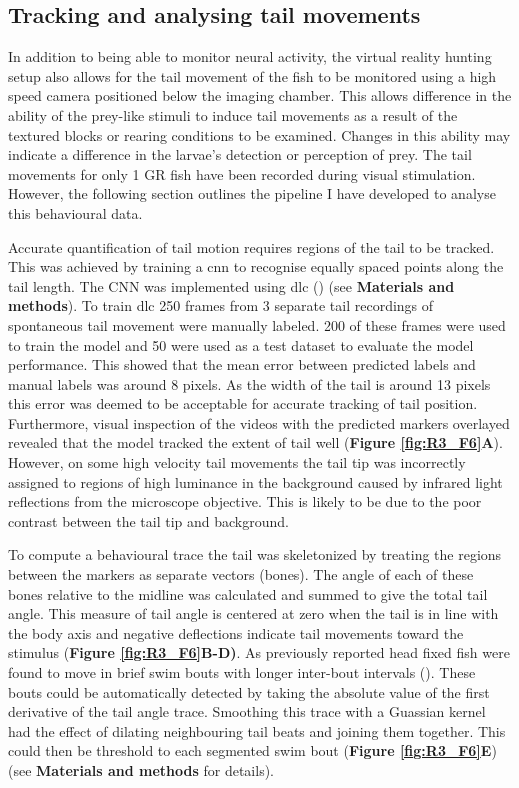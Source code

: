 \subsection{Tracking and analysing tail movements}
In addition to being able to monitor neural activity, the virtual reality hunting setup also allows for the tail movement of the fish to be monitored using a high speed camera positioned below the imaging chamber. This allows difference in the ability of the prey-like stimuli to induce tail movements as a result of the textured blocks or rearing conditions to be examined. Changes in this ability may indicate a difference in the larvae's detection or perception of prey. The tail movements for only 1 GR fish have been recorded during visual stimulation. However, the following section outlines the pipeline I have developed to analyse this behavioural data.

Accurate quantification of tail motion requires regions of the tail to be tracked. This was achieved by training a \gls{cnn} to recognise equally spaced points along the tail length.  The CNN was implemented using \gls{dlc} (\cite{Mathis2018DeepLabCut:Learning}) (see \textbf{Materials and methods}). To train \gls{dlc} 250 frames from 3 separate tail recordings of spontaneous tail movement were manually labeled. 200 of these frames were used to train the model and 50 were used as a test dataset to evaluate the model performance. This showed that the mean error between predicted labels and manual labels was around 8 pixels. As the width of the tail is around 13 pixels this error was deemed to be acceptable for accurate tracking of tail position. Furthermore, visual inspection of the videos with the predicted markers overlayed revealed that the model tracked the extent of tail well (\textbf{Figure \ref{fig:R3_F6}A}). However, on some high velocity tail movements the tail tip was incorrectly assigned to regions of high luminance in the background caused by infrared light reflections from the microscope objective. This is likely to be due to the poor contrast between the tail tip and background.

To compute a behavioural trace the tail was skeletonized by treating the regions between the markers as separate vectors (bones). The angle of each of these bones relative to the midline was calculated and summed to give the total tail angle. This measure of tail angle is centered at zero when the tail is in line with the body axis and negative deflections indicate tail movements toward the stimulus (\textbf{Figure \ref{fig:R3_F6}B-D)}.  As previously reported head fixed fish were found to move in brief swim bouts with longer inter-bout intervals (\cite{Semmelhack2014}). These bouts could be automatically detected by taking the absolute value of the first derivative of the tail angle trace. Smoothing this trace with a Guassian kernel had the effect of dilating neighbouring tail beats and joining them together. This could then be threshold to each segmented swim bout  (\textbf{Figure \ref{fig:R3_F6}E}) (see \textbf{Materials and methods} for details).

